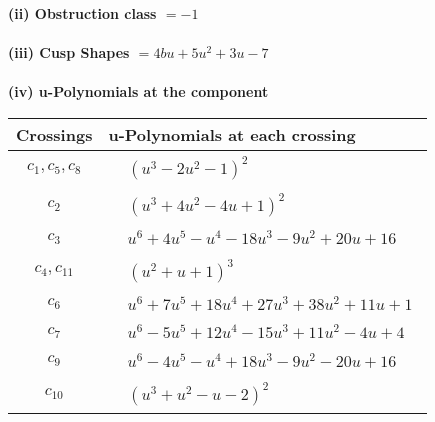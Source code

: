 \documentclass[1p]{elsarticle_modified}
\theoremstyle{definition}
\begin{document}
\flushleft \textbf{(ii) Obstruction class $= -1$}\\~\\
\flushleft \textbf{(iii) Cusp Shapes $= 4 b u+5 u^2+3 u-7$}\\~\\
\newpage\renewcommand{\arraystretch}{1}
\flushleft \textbf{(iv) u-Polynomials at the component}\newline \\
\begin{tabular}{m{50pt}|m{274pt}}
Crossings & \hspace{64pt}u-Polynomials at each crossing \\
\hline $$\begin{aligned}c_{1},c_{5},c_{8}\end{aligned}$$&$\begin{aligned}
&(u^3-2 u^2-1)^2
\end{aligned}$\\
\hline $$\begin{aligned}c_{2}\end{aligned}$$&$\begin{aligned}
&(u^3+4 u^2-4 u+1)^2
\end{aligned}$\\
\hline $$\begin{aligned}c_{3}\end{aligned}$$&$\begin{aligned}
&u^6+4 u^5- u^4-18 u^3-9 u^2+20 u+16
\end{aligned}$\\
\hline $$\begin{aligned}c_{4},c_{11}\end{aligned}$$&$\begin{aligned}
&(u^2+u+1)^3
\end{aligned}$\\
\hline $$\begin{aligned}c_{6}\end{aligned}$$&$\begin{aligned}
&u^6+7 u^5+18 u^4+27 u^3+38 u^2+11 u+1
\end{aligned}$\\
\hline $$\begin{aligned}c_{7}\end{aligned}$$&$\begin{aligned}
&u^6-5 u^5+12 u^4-15 u^3+11 u^2-4 u+4
\end{aligned}$\\
\hline $$\begin{aligned}c_{9}\end{aligned}$$&$\begin{aligned}
&u^6-4 u^5- u^4+18 u^3-9 u^2-20 u+16
\end{aligned}$\\
\hline $$\begin{aligned}c_{10}\end{aligned}$$&$\begin{aligned}
&(u^3+u^2- u-2)^2
\end{aligned}$\\
\hline
\end{tabular}\\~\\
\end{document}
